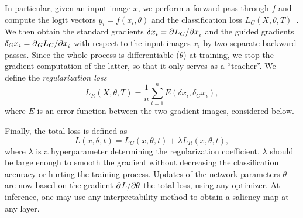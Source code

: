 In particular, given an input image $x$, we perform a forward pass through $f$ and compute the logit vectors $y_i = f(x_i, \theta)$ and the classification loss $L_C(X, \theta, T)$~. We then obtain the standard gradients $\delta x_i = \partial^{}{L_C}/\partial{x_i^{}}$ and the guided gradients $\delta_G x_i = \partial^{}{_G L_C}/\partial{x_i^{}}$ with respect to the input images $x_i$ by two separate backward passes. Since the whole process is differentiable (\wrt $\theta$) at training, we stop the gradient computation of the latter, so that it only serves as a ``teacher''. We define the \emph{regularization loss} 
\begin{equation}
	L_R(X, \theta, T) = \frac{1}{n} \sum_{i=1}^n E(\delta x_i, \delta_G x_i),
\label{eq:reg}
\end{equation}
where $E$ is an error function between the two gradient images, considered below.

Finally, the total loss is defined as
\begin{equation}
	L(x, \theta, t) = L_C(x, \theta, t) + \lambda L_R(x, \theta, t),
\label{eq:total}
\end{equation}
where $\lambda$ is a hyperparameter determining the regularization coefficient. 
$\lambda$ should be large enough to smooth the gradient without decreasing the classification accuracy or hurting the training process. 
Updates of the network parameters $\theta$ are now based on the gradient $\partial^{}{L}/\partial{\theta^{}}$ \wrt the total loss, using any optimizer. At inference, one may use any interpretability method to obtain a saliency map at any layer.


